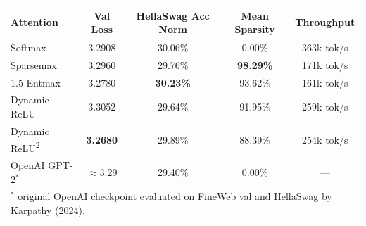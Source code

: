\documentclass{standalone}
\begin{document}
\begin{tabular}{lcccc}
\toprule
Attention & Val Loss & HellaSwag Acc Norm & Mean Sparsity & Throughput \\
\midrule
Softmax & 3.2908 & 30.06\% & 0.00\% & 363k tok/s \\
Sparsemax & 3.2960 & 29.76\% & \textbf{98.29\%} & 171k tok/s \\
1.5-Entmax & 3.2780 & \textbf{30.23\%} & 93.62\% & 161k tok/s \\
Dynamic ReLU & 3.3052 & 29.64\% & 91.95\% & 259k tok/s \\
Dynamic ReLU\textsuperscript{2} & \textbf{3.2680} & 29.89\% & 88.39\% & 254k tok/s \\
OpenAI GPT-2$^*$ & $\approx$3.29 & 29.40\% & 0.00\% & {---} \\
\bottomrule
\multicolumn{5}{l}{\small $^*$ original OpenAI checkpoint evaluated on FineWeb val and HellaSwag by Karpathy (2024).} \\
\end{tabular}
\end{document}
